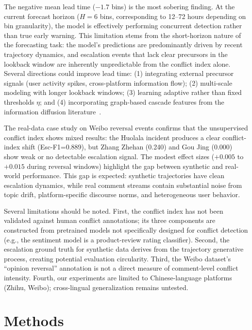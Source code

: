 \documentclass[11pt,a4paper]{article}
\begin{document}
The negative mean lead time ($-1.7$ bins) is the most sobering finding. At the current forecast horizon ($H{=}6$ bins, corresponding to 12--72 hours depending on bin granularity), the model is effectively performing concurrent detection rather than true early warning. This limitation stems from the short-horizon nature of the forecasting task: the model's predictions are predominantly driven by recent trajectory dynamics, and escalation events that lack clear precursors in the lookback window are inherently unpredictable from the conflict index alone. Several directions could improve lead time: (1) integrating external precursor signals (user activity spikes, cross-platform information flow); (2) multi-scale modeling with longer lookback windows; (3) learning adaptive rather than fixed thresholds $\eta$; and (4) incorporating graph-based cascade features from the information diffusion literature~\cite{xu2025d2,xu2025hyperidp}.

The real-data case study on Weibo reversal events confirms that the unsupervised conflict index shows mixed results: the Huolala incident produces a clear conflict-index shift (Esc-F1=0.889), but Zhang Zhehan (0.240) and Gou Jing (0.000) show weak or no detectable escalation signal. The modest effect sizes ($+0.005$ to $+0.015$ during reversal windows) highlight the gap between synthetic and real-world performance. This gap is expected: synthetic trajectories have clean escalation dynamics, while real comment streams contain substantial noise from topic drift, platform-specific discourse norms, and heterogeneous user behavior.

Several limitations should be noted. First, the conflict index has not been validated against human conflict annotations; its three components are constructed from pretrained models not specifically designed for conflict detection (e.g., the sentiment model is a product-review rating classifier). Second, the escalation ground truth for synthetic data derives from the trajectory generative process, creating potential evaluation circularity. Third, the Weibo dataset's ``opinion reversal'' annotation is not a direct measure of comment-level conflict intensity. Fourth, our experiments are limited to Chinese-language platforms (Zhihu, Weibo); cross-lingual generalization remains untested.

\section{Methods}
\end{document}
